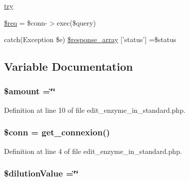 \begin{DoxyCompactItemize}
\item 
\hyperlink{edit__enzyme__in__standard_8php_abe4cc9788f52e49485473dc699537388}{try}
\item 
\hyperlink{edit__enzyme__in__standard_8php_a63a7a283ea5dee8af1e2d5a3435bf370}{\$req} = \$conn-\/$>$exec(\$query)
\item 
catch(Exception \$e) \hyperlink{edit__enzyme__in__standard_8php_a8452fb8131316637a04e25f5fde066d9}{\$response\-\_\-array} \mbox{[}'status'\mbox{]} =\$status
\end{DoxyCompactItemize}


\subsection{Variable Documentation}
\hypertarget{edit__enzyme__in__standard_8php_af48fe050f529b6ca56356299183b7778}{
\subsubsection[{\$amount}]{\setlength{\rightskip}{0pt plus 5cm}\$amount =\char`\"{}\char`\"{}}}\label{edit__enzyme__in__standard_8php_af48fe050f529b6ca56356299183b7778}


Definition at line 10 of file edit\-\_\-enzyme\-\_\-in\-\_\-standard.\-php.

\hypertarget{edit__enzyme__in__standard_8php_aa8a5a87b9c1a6a0819b88447cbe41877}{
\subsubsection[{\$conn}]{\setlength{\rightskip}{0pt plus 5cm}\$conn = {\bf get\-\_\-connexion}()}}\label{edit__enzyme__in__standard_8php_aa8a5a87b9c1a6a0819b88447cbe41877}


Definition at line 4 of file edit\-\_\-enzyme\-\_\-in\-\_\-standard.\-php.

\hypertarget{edit__enzyme__in__standard_8php_ad5cb2bd1aacca5b8729d0dc753091153}{
\subsubsection[{\$dilution\-Value}]{\setlength{\rightskip}{0pt plus 5cm}\$dilution\-Value =\char`\"{}\char`\"{}}}\label{edit__enzyme__in__standard_8php_ad5cb2bd1aacca5b8729d0dc753091153}


